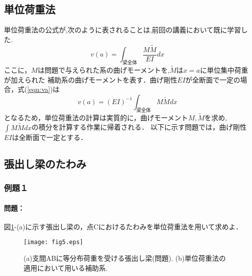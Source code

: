 ﻿\documentclass[10pt,a4j]{jarticle}
\begin{document}
\subsection{単位荷重法}
単位荷重法の公式が,次のように表されることは,前回の講義において既に学習した.
\begin{equation}
	v(a)=\int_{梁全体} \frac{M\tilde M}{EI}dx
	\label{eqn:va}
\end{equation}
ここに，$M$は問題で与えられた系の曲げモーメントを,$\tilde M$は$x=a$に単位集中荷重が加えられた
補助系の曲げモーメントを表す．曲げ剛性$EI$が全断面で一定の場合，式(\ref{eqn:va})は
\begin{equation}
	v(a)=(EI)^{-1}\int_{梁全体} M\tilde Mdx
	\label{eqn:va2}
\end{equation}
となるため，単位荷重法の計算は実質的に，曲げモーメント$M,\tilde M$を求め,
$\int M\tilde M dx$の積分を計算する作業に帰着される．
以下に示す問題では，曲げ剛性$EI$は全断面で一定とする．
\subsection{張出し梁のたわみ}
\subsubsection{例題１}
\paragraph{問題：}
図\ref{fig:fig2_5}-(a)に示す張出し梁の，点Cにおけるたわみを単位荷重法を用いて求めよ．
\begin{figure}[h]
	\begin{center}
	\texttt{[image: fig5.eps]} 
	\end{center}
	\caption{(a)支間ABに等分布荷重を受ける張出し梁(問題).
	 (b)単位荷重法の適用において用いる補助系.} 
	\label{fig:fig2_5}
\end{figure}
\end{document}
